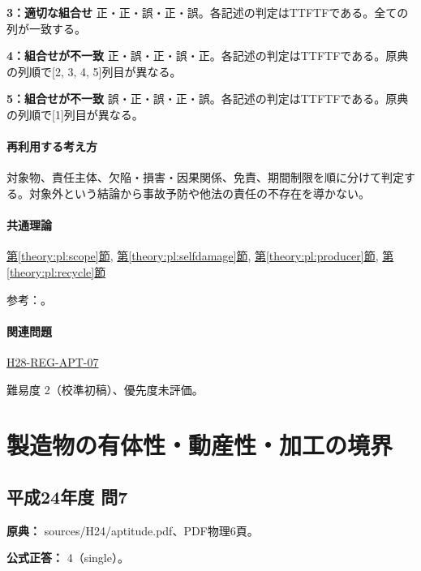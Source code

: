 \noindent\textbf{3：適切な組合せ} 正・正・誤・正・誤。各記述の判定はTTFTFである。全ての列が一致する。\par

\noindent\textbf{4：組合せが不一致} 正・誤・正・誤・正。各記述の判定はTTFTFである。原典の列順で[2, 3, 4, 5]列目が異なる。\par

\noindent\textbf{5：組合せが不一致} 誤・正・誤・正・誤。各記述の判定はTTFTFである。原典の列順で[1]列目が異なる。\par

\paragraph{再利用する考え方} 対象物、責任主体、欠陥・損害・因果関係、免責、期間制限を順に分けて判定する。対象外という結論から事故予防や他法の責任の不存在を導かない。

\paragraph{共通理論} \hyperref[theory:pl:scope]{第\ref*{theory:pl:scope}節}, \hyperref[theory:pl:selfdamage]{第\ref*{theory:pl:selfdamage}節}, \hyperref[theory:pl:producer]{第\ref*{theory:pl:producer}節}, \hyperref[theory:pl:recycle]{第\ref*{theory:pl:recycle}節}

\par 参考：\cite{pl_statute,pl_qa,pl_definitions2018}。

\paragraph{関連問題} \hyperref[q:h28-reg-apt-07]{H28-REG-APT-07}

\par 難易度 2（校準初稿）、優先度未評価。

\section{製造物の有体性・動産性・加工の境界}

\subsection{平成24年度 問7}
\label{q:h24-reg-apt-07}

\noindent\textbf{原典：} sources/H24/aptitude.pdf、PDF物理6頁。

\textbf{公式正答：} 4（single）。

